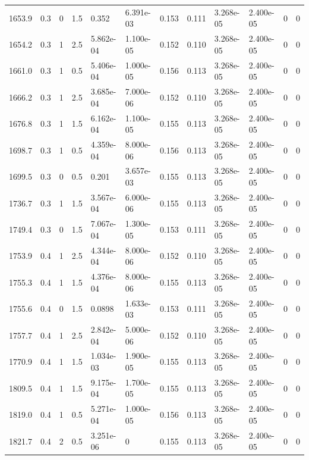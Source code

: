 \documentclass[preview]{standalone}
\begin{document}
{{{\begin{tabular}{L{1.2cm}C{1.2cm} C{0.3cm}C{0.5cm} C{1.4cm}C{1.4cm} C{1.4cm}C{1.4cm} C{1.6cm}C{1.6cm} C{1.6cm}C{1.6cm}}
  1653.9  &   0.3  & 0     & 1.5 &  0.352  & 6.391e-03  &  0.153&   0.111& 3.268e-05 & 2.400e-05   &  0 & 0  \\ 
  1654.2  &   0.3  & 1     & 2.5 &  5.862e-04  & 1.100e-05  &  0.152&   0.110& 3.268e-05 & 2.400e-05   &  0 & 0  \\ 
  1661.0  &   0.3  & 1     & 0.5 &  5.406e-04  & 1.000e-05  &  0.156&   0.113& 3.268e-05 & 2.400e-05   &  0 & 0  \\ 
  1666.2  &   0.3  & 1     & 2.5 &  3.685e-04  & 7.000e-06  &  0.152&   0.110& 3.268e-05 & 2.400e-05   &  0 & 0  \\ 
  1676.8  &   0.3  & 1     & 1.5 &  6.162e-04  & 1.100e-05  &  0.155&   0.113& 3.268e-05 & 2.400e-05   &  0 & 0  \\ 
  1698.7  &   0.3  & 1     & 0.5 &  4.359e-04  & 8.000e-06  &  0.156&   0.113& 3.268e-05 & 2.400e-05   &  0 & 0  \\ 
  1699.5  &   0.3  & 0     & 0.5 &  0.201  & 3.657e-03  &  0.155&   0.113& 3.268e-05 & 2.400e-05   &  0 & 0  \\ 
  1736.7  &   0.3  & 1     & 1.5 &  3.567e-04  & 6.000e-06  &  0.155&   0.113& 3.268e-05 & 2.400e-05   &  0 & 0  \\ 
  1749.4  &   0.3  & 0     & 1.5 &  7.067e-04  & 1.300e-05  &  0.153&   0.111& 3.268e-05 & 2.400e-05   &  0 & 0  \\ 
  1753.9  &   0.4  & 1     & 2.5 &  4.344e-04  & 8.000e-06  &  0.152&   0.110& 3.268e-05 & 2.400e-05   &  0 & 0  \\ 
  1755.3  &   0.4  & 1     & 1.5 &  4.376e-04  & 8.000e-06  &  0.155&   0.113& 3.268e-05 & 2.400e-05   &  0 & 0  \\ 
  1755.6  &   0.4  & 0     & 1.5 &  0.0898  & 1.633e-03  &  0.153&   0.111& 3.268e-05 & 2.400e-05   &  0 & 0  \\ 
  1757.7  &   0.4  & 1     & 2.5 &  2.842e-04  & 5.000e-06  &  0.152&   0.110& 3.268e-05 & 2.400e-05   &  0 & 0  \\ 
  1770.9  &   0.4  & 1     & 1.5 &  1.034e-03  & 1.900e-05  &  0.155&   0.113& 3.268e-05 & 2.400e-05   &  0 & 0  \\ 
  1809.5  &   0.4  & 1     & 1.5 &  9.175e-04  & 1.700e-05  &  0.155&   0.113& 3.268e-05 & 2.400e-05   &  0 & 0  \\ 
  1819.0  &   0.4  & 1     & 0.5 &  5.271e-04  & 1.000e-05  &  0.156&   0.113& 3.268e-05 & 2.400e-05   &  0 & 0  \\ 
  1821.7  &   0.4  & 2     & 0.5 &  3.251e-06  & 0  &  0.155&   0.113& 3.268e-05 & 2.400e-05   &  0 & 0  \\ 

\end{tabular}}}}
\end{document}
